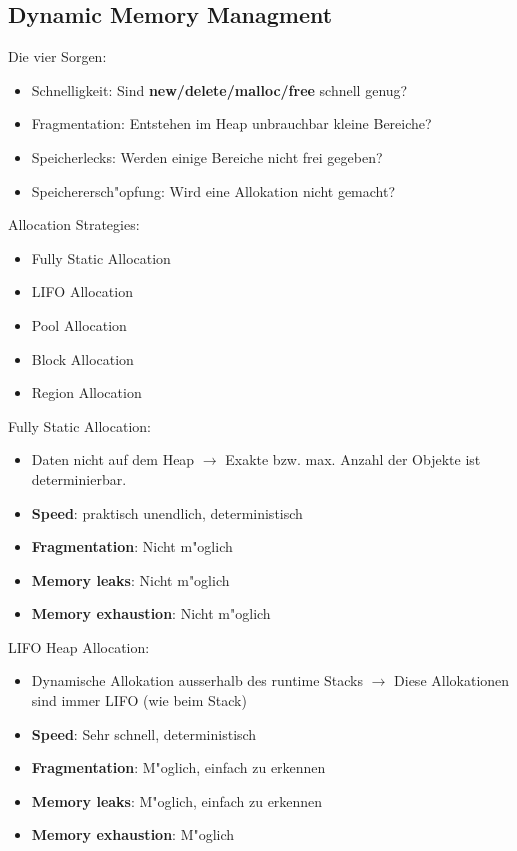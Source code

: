\subsection{Dynamic Memory Managment}
Die vier Sorgen:
\begin{itemize}
\item Schnelligkeit: Sind \textbf{new/delete/malloc/free} schnell genug?
\item Fragmentation: Entstehen im Heap unbrauchbar kleine Bereiche?
\item Speicherlecks: Werden einige Bereiche nicht frei gegeben?
\item Speicherersch"opfung: Wird eine Allokation nicht gemacht?
\end{itemize}

Allocation Strategies: 
\begin{itemize}
\item Fully Static Allocation
\item LIFO Allocation
\item Pool Allocation
\item Block Allocation
\item Region Allocation
\end{itemize}

Fully Static Allocation: 
\begin{itemize}
\item Daten nicht auf dem Heap $\rightarrow$ Exakte bzw. max. Anzahl der Objekte ist determinierbar.
\item \textbf{Speed}: praktisch unendlich, deterministisch
\item \textbf{Fragmentation}: Nicht m"oglich
\item \textbf{Memory leaks}: Nicht m"oglich
\item \textbf{Memory exhaustion}: Nicht m"oglich
\end{itemize}

LIFO Heap Allocation: 
\begin{itemize}
\item Dynamische Allokation ausserhalb des runtime Stacks $\rightarrow$ Diese Allokationen sind immer LIFO (wie beim Stack)
\item \textbf{Speed}: Sehr schnell, deterministisch 
\item \textbf{Fragmentation}: M"oglich, einfach zu erkennen
\item \textbf{Memory leaks}: M"oglich, einfach zu erkennen
\item \textbf{Memory exhaustion}: M"oglich
\end{itemize}

